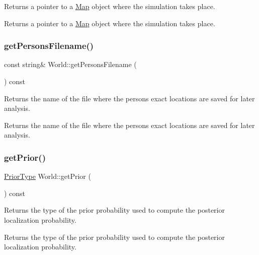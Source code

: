 Returns a pointer to a \mbox{\hyperlink{class_map}{Map}} object where the simulation takes place. \begin{DoxyReturn}{Returns}
a pointer to a \mbox{\hyperlink{class_map}{Map}} object where the simulation takes place. 
\end{DoxyReturn}
\mbox{\label{class_world_a206508d427e13c242855d9e11e5bed72}} 
\subsubsection{\texorpdfstring{getPersonsFilename()}{getPersonsFilename()}}
{\footnotesize\ttfamily const string\& World\+::get\+Persons\+Filename (\begin{DoxyParamCaption}{ }\end{DoxyParamCaption}) const}

Returns the name of the file where the persons exact locations are saved for later analysis. \begin{DoxyReturn}{Returns}
the name of the file where the persons exact locations are saved for later analysis. 
\end{DoxyReturn}
\mbox{\label{class_world_a9d7c2f5e7d357b891fac1728a932885f}} 
\subsubsection{\texorpdfstring{getPrior()}{getPrior()}}
{\footnotesize\ttfamily \mbox{\hyperlink{_prior_type_8h_a61286c562e68de246982fc393a7c23a5}{Prior\+Type}} World\+::get\+Prior (\begin{DoxyParamCaption}{ }\end{DoxyParamCaption}) const}

Returns the type of the prior probability used to compute the posterior localization probability. \begin{DoxyReturn}{Returns}
the type of the prior probability used to compute the posterior localization probability. 
\end{DoxyReturn}
\mbox{\label{class_world_a026bdf1e190cdaf02481c548b8ca1a6f}} 
